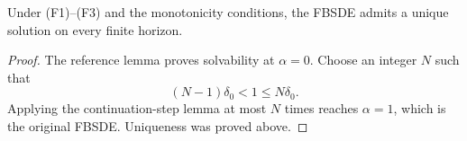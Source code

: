 \begin{thm}
Under \textup{(F1)}--\textup{(F3)} and the monotonicity conditions, the
FBSDE admits a unique solution on every finite horizon.
\end{thm}

\begin{proof}
The reference lemma proves solvability at $\alpha=0$.  Choose an integer
$N$ such that
\[
  (N-1)\delta_0<1\le N\delta_0.
\]
Applying the continuation-step lemma at most $N$ times reaches
$\alpha=1$, which is the original FBSDE\@.  Uniqueness was proved above.
\end{proof}

